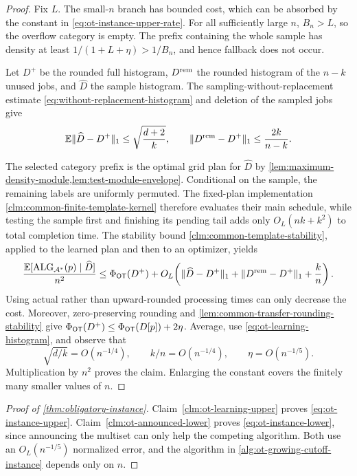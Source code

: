 \begin{proof}
Fix $L$.  The small-$n$ branch has bounded cost, which can be absorbed by the
constant in \cref{eq:ot-instance-upper-rate}.  For all sufficiently large
$n$, $B_n>L$, so the overflow category
is empty.  The prefix containing the whole sample has density at least
$1/(1+L+\eta)>1/B_n$, and hence fallback does not occur.

Let $D^+$ be the rounded full histogram, $D^{\rm rem}$ the rounded histogram
of the $n-k$ unused jobs, and $\widehat D$ the sample histogram.  The
sampling-without-replacement estimate
\cref{eq:without-replacement-histogram} and deletion of the sampled jobs give
\begin{equation}
 \mathbb{E}\|\widehat D-D^+\|_1\le\sqrt{\frac{d+2}{k}},
 \qquad
 \|D^{\rm rem}-D^+\|_1\le\frac{2k}{n-k}.
 \label{eq:ot-learning-histogram}
\end{equation}

The selected category prefix is the optimal grid plan for
$\widehat D$ by \cref{lem:maximum-density-module,lem:test-module-envelope}.
Conditional on the sample, the remaining labels are uniformly permuted.
The fixed-plan implementation
\cref{clm:common-finite-template-kernel} therefore evaluates their main
schedule, while testing the sample first and finishing its pending tail adds
only $O_L(nk+k^2)$ to total completion time.  The stability bound
\cref{clm:common-template-stability}, applied to the learned plan and
then to an optimizer, yields
\[
 \frac{\mathbb{E}[\operatorname{ALG}_{\mathcal A^*}(p)\mid\widehat D]}{n^2}
 \le \Phi_{\mathsf{OT}}(D^+)
 +O_L\!\left(
   \|\widehat D-D^+\|_1+
   \|D^{\rm rem}-D^+\|_1+
   \frac{k}{n}\right).
\]
Using actual rather than upward-rounded processing times can only decrease
the cost.  Moreover, zero-preserving rounding and
\cref{lem:common-transfer-rounding-stability} give
$\Phi_{\mathsf{OT}}(D^+)\le\Phi_{\mathsf{OT}}(D[p])+2\eta$.
Average, use \cref{eq:ot-learning-histogram}, and observe that
\[
 \sqrt{d/k}=O(n^{-1/4}),\qquad
 k/n=O(n^{-1/4}),\qquad
 \eta=O(n^{-1/5}).
\]
Multiplication by $n^2$ proves the claim.  Enlarging the constant covers the
finitely many smaller values of $n$.
\end{proof}

\begin{proof}[Proof of \cref{thm:obligatory-instance}]
Claim~\ref{clm:ot-learning-upper} proves \cref{eq:ot-instance-upper}.
Claim~\ref{clm:ot-announced-lower} proves
\cref{eq:ot-instance-lower}, since announcing the multiset can only help the
competing algorithm.  Both use an $O_L(n^{-1/5})$ normalized error, and the
algorithm in \cref{alg:ot-growing-cutoff-instance} depends only on $n$.
\end{proof}

